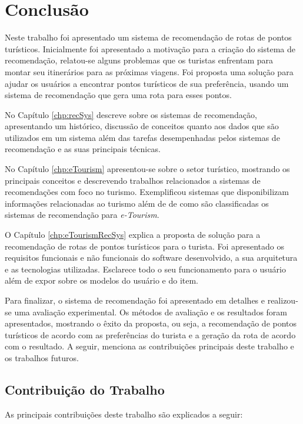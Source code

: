 \chapter{Conclusão}
\label{chp:conclusion}

Neste trabalho foi apresentado um sistema de recomendação de rotas de pontos turísticos. Inicialmente foi apresentado a motivação para a criação do sistema de recomendação, relatou-se alguns problemas que os turistas enfrentam para montar seu itinerários para as próximas viagens. Foi proposta uma solução para ajudar os usuários a encontrar pontos turísticos de sua preferência, usando um sistema de recomendação que gera uma rota para esses pontos.

No Capítulo \ref{chp:recSys} descreve sobre os sistemas de recomendação,  apresentando um histórico, discussão de conceitos quanto aos dados que são utilizados em um sistema além das tarefas desempenhadas pelos sistemas de recomendação e as suas principais técnicas.

No Capítulo \ref{chp:eTourism} apresentou-se sobre o setor turístico, mostrando os principais conceitos e descrevendo trabalhos relacionados a sistemas de recomendações com foco no turismo. Exemplificou sistemas que disponibilizam informações relacionadas ao turismo além de de como são classificadas os sistemas de recomendação para \textit{e-Tourism}.

O Capítulo \ref{chp:eTourismRecSys} explica a proposta de solução para a recomendação de rotas de pontos turísticos para o turista. Foi apresentado os requisitos funcionais e não funcionais do software desenvolvido, a sua arquitetura e as tecnologias utilizadas. Esclarece todo o seu funcionamento para o usuário além de expor sobre os modelos do usuário e do item.

Para finalizar, o sistema de recomendação foi apresentado em detalhes e realizou-se uma avaliação experimental. Os métodos de avaliação e os resultados foram apresentados, mostrando o êxito da proposta, ou seja, a recomendação de pontos turísticos de acordo com as preferências do turista e a geração da rota de acordo com o resultado. A seguir, menciona as contribuições principais deste trabalho e os trabalhos futuros.

\section{Contribuição do Trabalho}

As principais contribuições deste trabalho são explicados a seguir:

